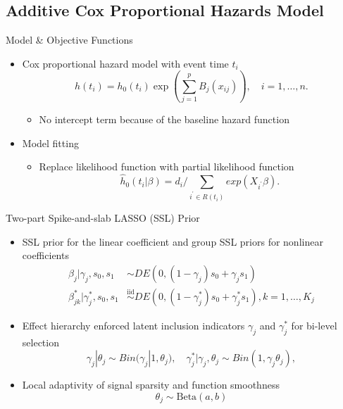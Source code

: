 \documentclass[
  ignorenonframetext,
  aspectratio=169]{beamer}
\providecommand{\tightlist}{%
  \setlength{\itemsep}{0pt}\setlength{\parskip}{0pt}}
\newcommand{\tp}{*}
\newcommand{\simiid}{\overset{\text{iid}}{\sim}}
\begin{document}
\hypertarget{additive-cox-proportional-hazards-model}{%
\subsection{Additive Cox Proportional Hazards
Model}\label{additive-cox-proportional-hazards-model}}

\begin{frame}{Model \& Objective Functions}
\protect\hypertarget{model-objective-functions}{}
\begin{itemize}
\tightlist
\item
  Cox proportional hazard model with event time \(t_i\) \[
  h(t_i) = h_0(t_i)\exp(\sum\limits^p_{j=1}B_j(x_{ij})) , \quad i = 1, \dots, n.
  \]

  \begin{itemize}
  \tightlist
  \item
    No intercept term because of the baseline hazard function
  \end{itemize}
\item
  Model fitting

  \begin{itemize}
  \tightlist
  \item
    Replace likelihood function with partial likelihood function \[
    \hat h_0(t_i|\beta) = d_i/\sum\limits_{i^\prime \in R(t_i)} exp(X_{i^\prime}\beta).
    \]
  \end{itemize}
\end{itemize}
\end{frame}

\begin{frame}{Two-part Spike-and-slab LASSO (SSL) Prior}
\protect\hypertarget{two-part-spike-and-slab-lasso-ssl-prior-1}{}
\begin{itemize}
\tightlist
\item
  SSL prior for the linear coefficient and group SSL priors for
  nonlinear coefficients \begin{align*}
  \beta_{j} |\gamma_{j},s_0,s_1 &\sim DE(0,(1-\gamma_{j}) s_0 + \gamma_{j} s_1) \\
  \beta^\tp_{jk} | \gamma^\tp_{j},s_0,s_1 &\simiid DE(0,(1-\gamma^\tp_{j}) s_0 + \gamma^\tp_{j} s_1), k = 1, \dots, K_j
  \end{align*}
\item
  Effect hierarchy enforced latent inclusion indicators \(\gamma_j\) and
  \(\gamma^\tp_{j}\) for bi-level selection \[
  \gamma_{j} | \theta_j \sim Bin(\gamma_{j}|1, \theta_j),\quad
  \gamma_{j}^\tp | \gamma_{j}, \theta_j \sim Bin(1, \gamma_{j}\theta_j),
  \]
\item
  Local adaptivity of signal sparsity and function smoothness \[
  \theta_j \sim \text{Beta}(a,b)
  \]
\end{itemize}
\end{frame}
\end{document}
